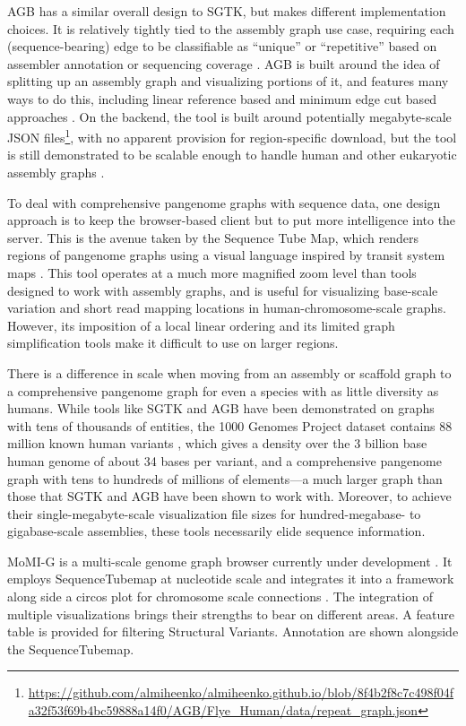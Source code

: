 AGB has a similar overall design to SGTK, but makes different implementation choices.
It is relatively tightly tied to the assembly graph use case, requiring each (sequence-bearing) edge to be classifiable as ``unique'' or ``repetitive'' based on assembler annotation or sequencing coverage \citep{Mikheenko_2019}.
AGB is built around the idea of splitting up an assembly graph and visualizing portions of it, and features many ways to do this, including linear reference based and minimum edge cut based approaches \citep{Mikheenko_2019}.
On the backend, the tool is built around potentially megabyte-scale JSON files\footnote{\url{https://github.com/almiheenko/almiheenko.github.io/blob/8f4b2f8c7c498f04fa32f53f69b4bc59888a14f0/AGB/Flye_Human/data/repeat_graph.json}}, with no apparent provision for region-specific download, but the tool is still demonstrated to be scalable enough to handle human and other eukaryotic assembly graphs \citep{Mikheenko_2019}.

To deal with comprehensive pangenome graphs with sequence data, one design approach is to keep the browser-based client but to put more intelligence into the server.
This is the avenue taken by the Sequence Tube Map, which renders regions of pangenome graphs using a visual language inspired by transit system maps \citep{Beyer_2019}.
This tool operates at a much more magnified zoom level than tools designed to work with assembly graphs, and is useful for visualizing base-scale variation and short read mapping locations in human-chromosome-scale graphs.
However, its imposition of a local linear ordering and its limited graph simplification tools make it difficult to use on larger regions.

There is a difference in scale when moving from an assembly or scaffold graph to a comprehensive pangenome graph for even a species with as little diversity as humans.
While tools like SGTK and AGB have been demonstrated on graphs with tens of thousands of entities, the 1000 Genomes Project dataset contains 88 million known human variants \citep{1000_2015}, which gives a density over the 3 billion base human genome of about 34 bases per variant, and a comprehensive pangenome graph with tens to hundreds of millions of elements---a much larger graph than those that SGTK and AGB have been shown to work with.
Moreover, to achieve their single-megabyte-scale visualization file sizes for hundred-megabase- to gigabase-scale assemblies, these tools necessarily elide sequence information.


MoMI-G is a multi-scale genome graph browser currently under development \cite{yokoyama_momi-g:_2019}. It employs SequenceTubemap at nucleotide scale and integrates it into a  framework along side a circos plot for chromosome scale connections . 
The integration of multiple visualizations brings their strengths to bear on different areas.   A feature table is provided for filtering Structural Variants.  Annotation are shown alongside the  SequenceTubemap.

